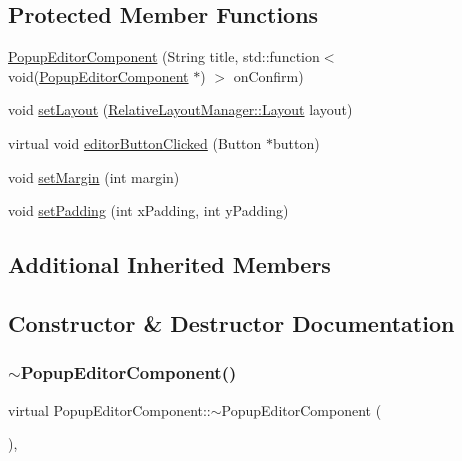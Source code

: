 \subsection*{Protected Member Functions}
\begin{DoxyCompactItemize}
\item 
\mbox{\hyperlink{classPopupEditorComponent_a44dd1d9087268253417897db476a297b}{Popup\+Editor\+Component}} (String title, std\+::function$<$ void(\mbox{\hyperlink{classPopupEditorComponent}{Popup\+Editor\+Component}} $\ast$) $>$ on\+Confirm)
\item 
void \mbox{\hyperlink{classPopupEditorComponent_a7dcb8e2d6f2cc8e43ff737e24aef687a}{set\+Layout}} (\mbox{\hyperlink{classRelativeLayoutManager_a3dcd4cd0bc41754f3b4a64bc29b5eca5}{Relative\+Layout\+Manager\+::\+Layout}} layout)
\item 
virtual void \mbox{\hyperlink{classPopupEditorComponent_a04250e5a637bacee146d8cd433413446}{editor\+Button\+Clicked}} (Button $\ast$button)
\item 
void \mbox{\hyperlink{classPopupEditorComponent_abf084b41df7439e868ae5fbfb795ed3d}{set\+Margin}} (int margin)
\item 
void \mbox{\hyperlink{classPopupEditorComponent_a1c97591f083cf00297a141b35d75dac3}{set\+Padding}} (int x\+Padding, int y\+Padding)
\end{DoxyCompactItemize}
\subsection*{Additional Inherited Members}


\subsection{Constructor \& Destructor Documentation}
\mbox{\label{classPopupEditorComponent_aeb019a4035a60ff85d624a77643cf877}} 
\subsubsection{\texorpdfstring{$\sim$\+Popup\+Editor\+Component()}{~PopupEditorComponent()}}
{\footnotesize\ttfamily virtual Popup\+Editor\+Component\+::$\sim$\+Popup\+Editor\+Component (\begin{DoxyParamCaption}{ }\end{DoxyParamCaption})\hspace{0.3cm}{\ttfamily [inline]}, {\ttfamily [virtual]}}

